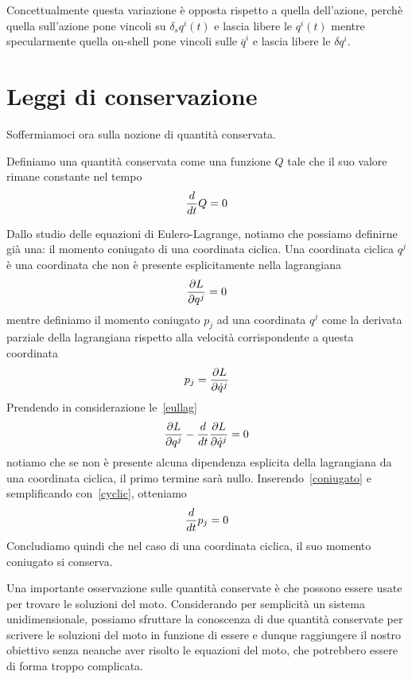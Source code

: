     Concettualmente questa variazione è opposta rispetto a quella dell'azione, perchè quella sull'azione pone vincoli su $\delta_s q^i(t)$ e lascia libere le $q^i(t)$ mentre specularmente quella on-shell pone vincoli sulle $\overline q^i$ e lascia libere le $\delta q^i$.

\section{Leggi di conservazione}
    Soffermiamoci ora sulla nozione di quantità conservata. 
    \begin{definition}
        Definiamo una quantità conservata come una funzione $Q$ tale che il suo valore rimane constante nel tempo
    \begin{equation} \label{th}
        \frac{d}{dt} Q = 0
    \end{equation}
    \end{definition} 

    Dallo studio delle equazioni di Eulero-Lagrange, notiamo che possiamo definirne già una: il momento coniugato di una coordinata ciclica. Una coordinata ciclica $q^j$ è una coordinata che non è presente esplicitamente nella lagrangiana
    \begin{equation} \label{cyclic}
        \frac{\partial L}{\partial q^j} = 0
    \end{equation}
    mentre definiamo il momento coniugato $p_j$ ad una coordinata $q^j$ come la derivata parziale della lagrangiana rispetto alla velocità corrispondente a questa coordinata
    \begin{equation} \label{coniugato}
        p_j = \frac{\partial L}{\partial\dot q^j}
    \end{equation}
    Prendendo in considerazione le~\eqref{eullag}
    \begin{equation*}
        \frac{\partial L}{\partial q^j}  - \frac{d}{dt} \frac{\partial L}{\partial\dot q^j} = 0
    \end{equation*}
    notiamo che se non è presente alcuna dipendenza esplicita della lagrangiana da una coordinata ciclica, il primo termine sarà nullo. Inserendo~\eqref{coniugato} e semplificando con~\eqref{cyclic}, otteniamo
    \begin{equation*}
        \frac{d}{dt} p_j = 0
    \end{equation*}
    Concludiamo quindi che nel caso di una coordinata ciclica, il suo momento coniugato si conserva. 

    Una importante osservazione sulle quantità conservate è che possono essere usate per trovare le soluzioni del moto. Considerando per semplicità un sistema unidimensionale, possiamo sfruttare la conoscenza di due quantità conservate per scrivere le soluzioni del moto in funzione di essere e dunque raggiungere il nostro obiettivo senza neanche aver risolto le equazioni del moto, che potrebbero essere di forma troppo complicata. 

